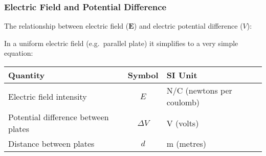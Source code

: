 \documentclass[12pt,aspectratio=169]{beamer}
\newcommand{\mb}[1]{\mathbf{#1}}
\newcommand{\eq}[2]{\vspace{#1}{\Large\begin{displaymath}#2\end{displaymath}}}
\begin{document}
\begin{frame}
  \frametitle{Electric Field and Potential Difference}
  
  The relationship between electric field ($\mb{E}$) and electric potential
  difference ($V$):
    
  \eq{-.15in}{
    \mb{E}=-\frac{\partial V}{\partial r}
  }

  In a uniform electric field (e.g.\ parallel plate) it simplifies to a very
  simple equation:

  \eq{-.2in}{
    \boxed{E=\frac{\Delta V}{d}}
  }

  \vspace{-.1in}
  \begin{center}
    \begin{tabular}{l|c|l}
      \rowcolor{pink}
      \textbf{Quantity} & \textbf{Symbol} & \textbf{SI Unit} \\ \hline
      Electric field intensity & $E$ & \si{N/C} (newtons per coulomb) \\
      Potential difference between plates & $\Delta V$ & \si{V} (volts) \\
      Distance between plates       & $d$ & \si{m} (metres)\\
    \end{tabular}
  \end{center}
\end{frame}
\end{document}
